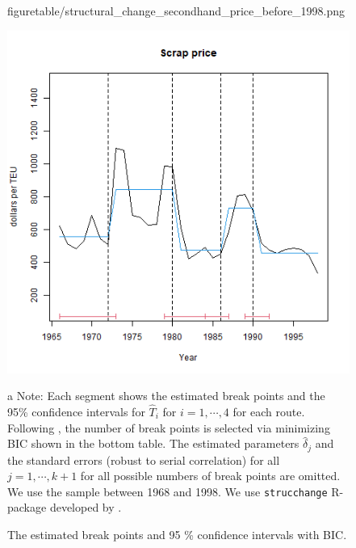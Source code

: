 \documentclass[11pt]{article}
\begin{document}
\begin{figure}[!ht]
\begin{minipage}[b]{0.3\linewidth}
  {figuretable/structural_change_secondhand_price_before_1998.png}
  \end{minipage}
  \begin{minipage}[b]{0.3\linewidth}
  \includegraphics[keepaspectratio, scale=0.31]
  {figuretable/structural_change_scrap_price_before_1998.png}
  \end{minipage}
  {\scriptsize{}
  
\caption{The estimated break points and 95 \% confidence intervals with BIC.}
\label{fg:structural_change_scrap_price_before_1998}
\begin{tablenotes}
\item[a]Note: Each segment shows the estimated break points and the 95\% confidence intervals for $\hat{T}_i$ for $i=1,\cdots,4$ for each route. Following \cite{bai2003computation}, the number of break points is selected via minimizing BIC shown in the bottom table. The estimated parameters $\hat{\delta}_j$ and the standard errors (robust to serial correlation) for all $j=1,\cdots,k+1$ for all possible numbers of break points are omitted. We use the sample between 1968 and 1998. We use \texttt{strucchange} R-package developed by \cite{zeileis2002strucchange}. 
   \end{tablenotes}
   }
\end{figure}
\end{document}
